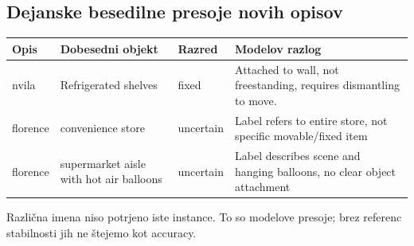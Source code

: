 \subsection*{Dejanske besedilne presoje novih opisov}\begin{center}\small\begin{tabular}{p{1.6cm}p{4.2cm}p{1.8cm}p{7.6cm}}\toprule
Opis & Dobesedni objekt & Razred & Modelov razlog \\ \midrule
nvila & Refrigerated shelves & fixed & Attached to wall, not freestanding, requires dismantling to move. \\
florence & convenience store & uncertain & Label refers to entire store, not specific movable/fixed item \\
florence & supermarket aisle with hot air balloons & uncertain & Label describes scene and hanging balloons, no clear object attachment \\
\bottomrule\end{tabular}\end{center}
Različna imena niso potrjeno iste instance. To so modelove presoje; brez referenc stabilnosti jih ne štejemo kot accuracy.

\newpage
